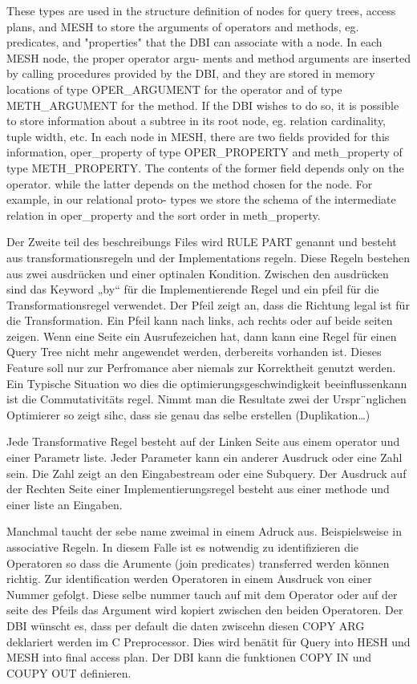 These types are used in the structure definition of nodes for query trees, access plans, and MESH to store the arguments of operators and methods, eg. predicates, and "properties" that the DBI can associate with a node. In each MESH node, the proper operator argu- ments and method arguments are inserted by calling procedures provided by the DBI, and they are stored in memory locations of type OPER_ARGUMENT for the operator and of type METH_ARGUMENT for the method. If the DBI wishes to do so, it is possible to store information about a subtree in its root node, eg. relation cardinality, tuple width, etc. In each node in MESH, there are two fields provided for this information, oper_property of type OPER_PROPERTY and meth_property of type METH_PROPERTY. The contents of the former field depends only on the operator. while the latter depends on the method chosen for the node. For example, in our relational proto- types we store the schema of the intermediate relation in oper_property and the sort order in meth_property.

Der Zweite teil des beschreibungs Files wird RULE PART genannt und besteht aus transformationsregeln und der Implementations regeln. Diese Regeln bestehen aus zwei ausdrücken und einer optinalen Kondition. Zwischen den ausdrücken sind das Keyword „by“ für die Implementierende Regel und ein pfeil für die Transformationsregel verwendet. Der Pfeil zeigt an, dass die Richtung legal ist für die Transformation. Ein Pfeil kann nach links, ach rechts oder auf beide seiten zeigen. Wenn eine Seite ein Ausrufezeichen hat, dann kann eine Regel für einen Query Tree nicht mehr angewendet werden, derbereits vorhanden ist. Dieses Feature soll nur zur Perfromance aber niemals zur Korrektheit genutzt werden. Ein Typische Situation wo dies die optimierungsgeschwindigkeit beeinflussenkann ist die Commutativitäts regel. Nimmt man die Resultate zwei der Urspr¨nglichen Optimierer so zeigt sihc, dass sie genau das selbe erstellen (Duplikation…)

Jede Transformative Regel besteht auf der Linken Seite aus einem operator und einer Parametr liste. Jeder Parameter kann ein anderer Ausdruck oder eine Zahl sein. Die Zahl zeigt an den Eingabestream oder eine Subquery. Der Ausdruck auf der Rechten Seite einer Implementierungsregel besteht aus einer methode und einer liste an Eingaben.

Manchmal taucht der sebe name zweimal in einem Adruck aus. Beispielsweise in associative Regeln. In diesem Falle ist es notwendig zu identifizieren die Operatoren so dass die Arumente (join predicates) transferred werden können richtig. Zur identification werden Operatoren in einem Ausdruck von einer Nummer gefolgt. Diese selbe nummer tauch auf mit dem Operator oder auf der seite des Pfeils das Argument wird kopiert zwischen den beiden Operatoren. Der DBI wünscht es, dass per default die daten zwiscehn diesen COPY ARG deklariert werden im C Preprocessor. Dies wird benätit für Query into HESH und MESH into final access plan. Der DBI kann die funktionen COPY IN und COUPY OUT definieren.  


